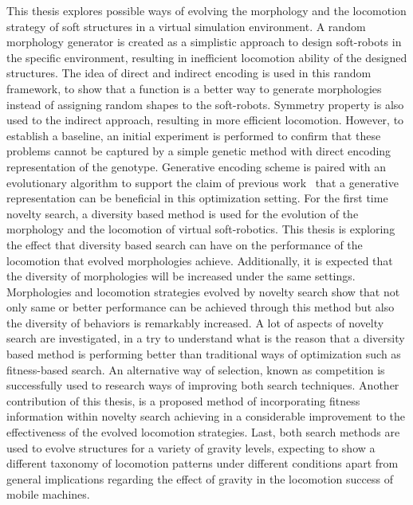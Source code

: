 This thesis explores possible ways of evolving the morphology and the locomotion strategy of soft structures in a virtual simulation environment. A random morphology generator is created as a simplistic approach to design soft-robots in the specific environment, resulting in inefficient locomotion ability of the designed structures. The idea of direct and indirect encoding is used in this random framework, to show that a function is a better way to generate morphologies instead of assigning random shapes to the soft-robots. Symmetry property is also used to the indirect approach, resulting in more efficient locomotion. However, to establish a  baseline, an initial experiment is performed to confirm that these problems cannot be captured by a simple genetic method with direct encoding representation of the genotype. Generative encoding scheme is paired with an evolutionary algorithm to support the claim of previous work~\citep{cheney2013unshackling} that a generative representation can be beneficial in this optimization setting. For the first time novelty search, a diversity based method is used for the evolution of the morphology and the locomotion of virtual soft-robotics. This thesis is exploring the effect that diversity based search can have on the performance of the locomotion that evolved morphologies achieve. Additionally, it is expected that the diversity of morphologies will be increased under the same settings. Morphologies and locomotion strategies evolved by novelty search show that not only same or better performance can be achieved through this method but also the diversity of behaviors is remarkably increased. A lot of aspects of novelty search are investigated, in a try to understand what is the reason that a diversity based method is performing better than traditional ways of optimization such as fitness-based search. An alternative way of selection, known as competition is successfully used to research ways of improving both search techniques. Another contribution of this thesis, is a proposed method of incorporating fitness information within novelty search achieving in a considerable improvement to the effectiveness of the evolved locomotion strategies. Last, both search methods are used to evolve structures for a variety of gravity levels, expecting to show a different taxonomy of locomotion patterns under different conditions apart from general implications regarding the effect of gravity in the locomotion success of mobile machines.







